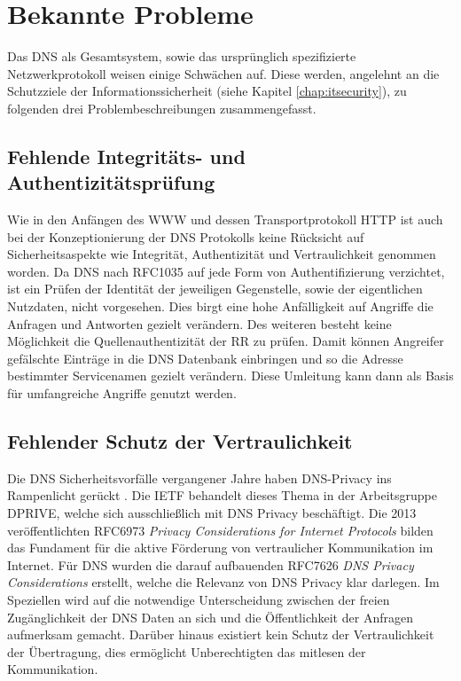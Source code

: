 \chapter{Bekannte Probleme}
\label{chap:threads}

Das DNS als Gesamtsystem, sowie das ursprünglich spezifizierte Netzwerkprotokoll weisen einige Schwächen auf. Diese werden, angelehnt an die Schutzziele der Informationssicherheit (siehe Kapitel \ref{chap:itsecurity}), zu folgenden drei Problembeschreibungen zusammengefasst.   

\section{Fehlende Integritäts- und Authentizitätsprüfung}
\label{sec:thread-auth}

Wie in den Anfängen des \ac{WWW} und dessen Transportprotokoll \ac{HTTP} ist auch bei der Konzeptionierung der DNS Protokolls keine Rücksicht auf Sicherheitsaspekte wie Integrität, Authentizität und Vertraulichkeit genommen worden. Da DNS nach RFC1035 \cite{rfc1035} auf jede Form von Authentifizierung verzichtet, ist ein Prüfen der Identität der jeweiligen Gegenstelle, sowie der eigentlichen Nutzdaten, nicht vorgesehen. Dies birgt eine hohe Anfälligkeit auf Angriffe die Anfragen und Antworten gezielt verändern. Des weiteren besteht keine Möglichkeit die Quellenauthentizität der RR zu prüfen. Damit können Angreifer gefälschte Einträge in die DNS Datenbank einbringen und so die Adresse bestimmter Servicenamen gezielt verändern. Diese Umleitung kann dann als Basis für umfangreiche Angriffe genutzt werden.

\section{Fehlender Schutz der Vertraulichkeit}
\label{sec:thread-priv}

Die DNS Sicherheitsvorfälle vergangener Jahre haben DNS-Privacy ins Rampenlicht gerückt  \cite{Greenwald2013}\cite{turkybbc2017}\cite{turkywp2018}. Die \ac{IETF} behandelt dieses Thema in der Arbeitsgruppe DPRIVE, welche sich ausschließlich mit DNS Privacy beschäftigt. Die 2013 veröffentlichten RFC6973 \textit{Privacy Considerations for Internet Protocols}\cite{rfc6973} bilden das Fundament für die aktive Förderung von vertraulicher Kommunikation im Internet. Für DNS wurden die darauf aufbauenden RFC7626 \textit{DNS Privacy Considerations} \cite{rfc7626} erstellt, welche die Relevanz von DNS Privacy klar darlegen. Im Speziellen wird auf die notwendige Unterscheidung zwischen der freien Zugänglichkeit der DNS Daten an sich und die Öffentlichkeit der Anfragen aufmerksam gemacht. Darüber hinaus existiert kein Schutz der Vertraulichkeit der Übertragung, dies ermöglicht Unberechtigten das mitlesen der Kommunikation.

